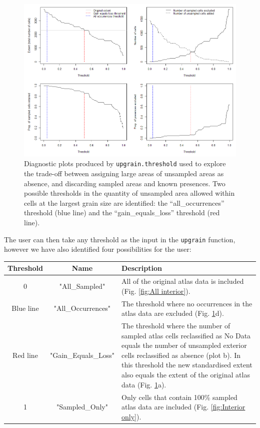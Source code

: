 \documentclass{article}[12pt, a4paper]
\begin{document}
\begin{figure}[ht]
\centering
\includegraphics[width=\linewidth]{Threshold_plots.png}
\caption{Diagnostic plots produced by \texttt{upgrain.threshold} used to explore the trade-off  between assigning large areas of unsampled areas as absence, and discarding sampled areas and known presences. Two possible thresholds in the quantity of unsampled area allowed within cells at the largest grain size are identified: the “all\_occurrences” threshold (blue line) and the “gain\_equals\_loss” threshold (red line).}
\label{fig:Threshold plots}
\end{figure}

The user can then take any threshold as the input in the \texttt{upgrain} function, however we have also identified four possibilities for the user: 

\begin{table}[!h]
\centering
\begin{tabular}{ c  c  p{6.2cm} }
\hline \noalign{\smallskip}
Threshold & Name & Description  \\
\hline \noalign{\smallskip}
0 & "All\_Sampled" & All of the original atlas data is included (Fig. \ref{fig:All interior}). \\ [0.2cm]

Blue line & "All\_Occurrences" & The threshold where no occurrences in the atlas data are excluded (Fig. \ref{fig:Threshold plots}d). \\ [0.2cm]

Red line & "Gain\_Equals\_Loss" & The threshold where the number of sampled atlas cells reclassified as No Data equals the number of unsampled exterior cells reclassified as absence (plot b). In this threshold the new standardised extent also equals the extent of the original atlas data (Fig. \ref{fig:Threshold plots}a). \\ [0.2cm]

1 & "Sampled\_Only" & Only cells that contain 100\% sampled atlas data are included (Fig. \ref{fig:Interior only}). \\ [0.1cm]
\hline
\end{tabular}
\end{table}
\end{document}
